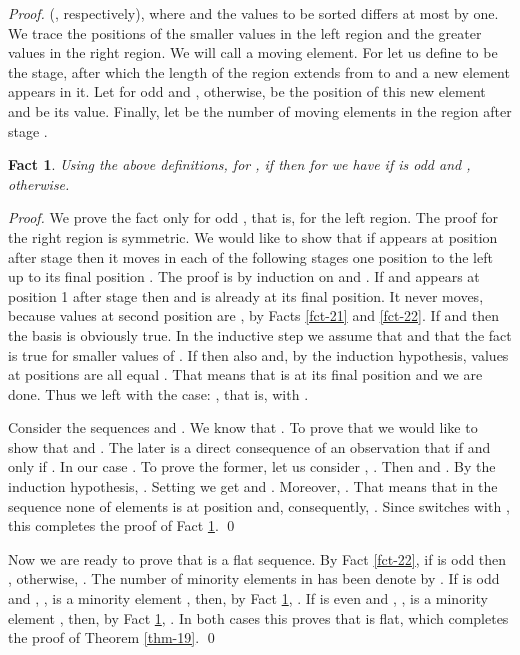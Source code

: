 \documentclass{llncs}
\newtheorem{fact}[theorem]{Fact}
\begin{document}
\begin{proof}
(, respectively),
where  and the values to be sorted differs at most by
one. We trace the positions of the smaller values  in the
left region and the greater values  in the right region. We
will call  a moving element. For  let us define  to be the stage, after which the length of the region extends from
 to  and a new element appears in it. Let  for odd  and
, otherwise, be the position of this new element and
 be its value. Finally, let  be the number of moving elements in the region after stage .
\begin{fact}\label{fct-23}
Using the above definitions, for , if  then for  we have  if  is 
odd and , otherwise.
\end{fact}
\begin{proof}
We prove the fact only for odd , that is, for the left region. The proof
for the right region is symmetric. We would like to show that if 
appears at position  after stage  then it moves in each of the
following stages one position to the left up to its final position . The
proof is by induction on  and . If  and  appears at
position 1 after stage  then  and  is already at its
final position. It never moves, because values at second position are , by Facts \ref{fct-21} and \ref{fct-22}. If  and  then the
basis  is obviously true. In the inductive step  we assume that 
 and that the fact is true for smaller 
values of . If  then also  
and, by the induction hypothesis, values at positions  
are all equal . That means that  is at its final position and we are 
done. Thus we left with the case: , that is, with . 

Consider the sequences  and . We know that . To prove that  we would like to show 
that  and . The 
later is a direct consequence of an observation that  if and 
only if . In our case . To prove the former, let us consider , . Then  and . By the induction 
hypothesis, . Setting  we 
get  and . Moreover, . That means that in the sequence  
 none of  elements  is at position  
and, consequently, . Since  
switches  with , this completes the proof of Fact \ref{fct-23}.  \qed
\end{proof}
Now we are ready to prove that  is a flat sequence. By
Fact \ref{fct-22}, if  is odd then , otherwise,
. The number of minority
elements in  has been denote by . If  is odd
and , , is a minority element , then, by
Fact \ref{fct-23}, . If  is even and , , is a minority element , then, by Fact
\ref{fct-23}, . In both cases this proves
that   is flat, which completes the proof of Theorem
\ref{thm-19}. \qed
\end{proof}
\end{document}
